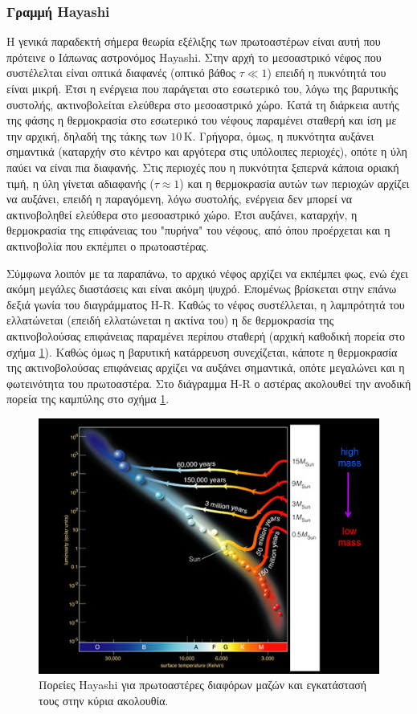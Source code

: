 \subsubsection{Γραμμή Hayashi}
Η γενικά παραδεκτή σήμερα θεωρία εξέλιξης των πρωτοαστέρων είναι αυτή που πρότεινε ο Ιάπωνας αστρονόμος Hayashi. Στην αρχή το μεσοαστρικό νέφος που συστέλελται είναι οπτικά διαφανές (οπτικό βάθος $\tau \ll 1$) επειδή η πυκνότητά του είναι μικρή. Έτσι η ενέργεια που παράγεται στο εσωτερικό του, λόγω της βαρυτικής συστολής, ακτινοβολείται ελεύθερα στο μεσοαστρικό χώρο. Κατά τη διάρκεια αυτής της φάσης η θερμοκρασία στο εσωτερικό του νέφους παραμένει σταθερή και ίση με την αρχική, δηλαδή της τάκης των $10 \,\text{K}$. Γρήγορα, όμως, η πυκνότητα αυξάνει σημαντικά (καταρχήν στο κέντρο και αργότερα στις υπόλοιπες περιοχές), οπότε η ύλη παύει να είναι πια διαφανής. Στις περιοχές που η πυκνότητα ξεπερνά κάποια οριακή τιμή, η ύλη γίνεται αδιαφανής ($\tau \approx 1$) και η θερμοκρασία αυτών των περιοχών αρχίζει να αυξάνει, επειδή η παραγόμενη, λόγω συστολής, ενέργεια δεν μπορεί να ακτινοβοληθεί ελεύθερα στο μεσοαστρικό χώρο. Έτσι αυξάνει, καταρχήν, η θερμοκρασία της επιφάνειας του "πυρήνα" του νέφους, από όπου προέρχεται και η ακτινοβολία που εκπέμπει ο πρωτοαστέρας.

Σύμφωνα λοιπόν με τα παραπάνω, το αρχικό νέφος αρχίζει να εκπέμπει φως, ενώ έχει ακόμη μεγάλες διαστάσεις και είναι ακόμη ψυχρό. Επομένως βρίσκεται στην επάνω δεξιά γωνία του διαγράμματος H-R. Καθώς το νέφος συστέλλεται, η λαμπρότητά του ελλατώνεται (επειδή ελλατώνεται η ακτίνα του) η δε θερμοκρασία της ακτινοβολούσας επιφάνειας παραμένει περίπου σταθερή (αρχική καθοδική πορεία στο σχήμα \ref{fig:hayashi_tracks}). Καθώς όμως η βαρυτική κατάρρευση συνεχίζεται, κάποτε η θερμοκρασία της ακτινοβολούσας επιφάνειας αρχίζει να αυξάνει σημαντικά, οπότε μεγαλώνει και η φωτεινότητα του πρωτοαστέρα. Στο διάγραμμα H-R ο αστέρας ακολουθεί την ανοδική πορεία της καμπύλης στο σχήμα \ref{fig:hayashi_tracks}.
\begin{figure}[h!]
    \centering
    \includegraphics[scale=0.5]{Figures/hayashi_tracks.jpg}
    \caption{Πορείες Hayashi για πρωτοαστέρες διαφόρων μαζών και εγκατάστασή τους στην κύρια ακολουθία.}
    \label{fig:hayashi_tracks}
\end{figure}

